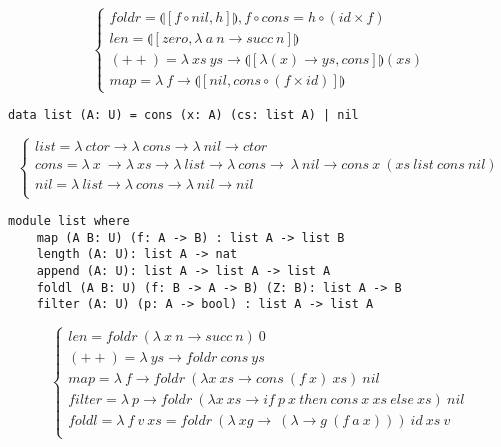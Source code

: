 $$
\begin{cases}
 foldr = \llparenthesis [ f \circ nil , h] \rrparenthesis, f \circ cons = h \circ (id \times f)\\
 len = \llparenthesis [ zero, \lambda\ a\ n \rightarrow succ\ n ] \rrparenthesis \\
 (++) = \lambda\ xs\ ys \rightarrow \llparenthesis [ \lambda (x) \rightarrow ys, cons ] \rrparenthesis (xs) \\
 map = \lambda\ f \rightarrow \llparenthesis [ nil, cons \circ (f \times id)] \rrparenthesis
\end{cases}
$$

\begin{lstlisting}[mathescape=true]
data list (A: U) = cons (x: A) (cs: list A) | nil
\end{lstlisting}

$$
\begin{cases}
list = \lambda\ ctor \rightarrow \lambda\ cons \rightarrow \lambda\ nil \rightarrow ctor\\
cons = \lambda\ x\ \rightarrow \lambda\ xs \rightarrow \lambda\ list \rightarrow \lambda\ cons \rightarrow\ \lambda\ nil \rightarrow cons\ x\ (xs\ list\ cons\ nil)\\
nil = \lambda\ list \rightarrow \lambda\ cons \rightarrow \lambda\ nil \rightarrow nil\\
\end{cases}
$$

\begin{lstlisting}[mathescape=true]
module list where
    map (A B: U) (f: A -> B) : list A -> list B
    length (A: U): list A -> nat
    append (A: U): list A -> list A -> list A
    foldl (A B: U) (f: B -> A -> B) (Z: B): list A -> B
    filter (A: U) (p: A -> bool) : list A -> list A
\end{lstlisting}

$$
\begin{cases}
len = foldr\ (\lambda\ x\ n \rightarrow succ\ n)\ 0\\
(++) = \lambda\ ys \rightarrow foldr\ cons\ ys\\
map = \lambda\ f \rightarrow foldr\ (\lambda x\ xs \rightarrow cons\ (f\ x)\ xs)\ nil\\
filter = \lambda\ p \rightarrow foldr\ (\lambda x\ xs \rightarrow if\ p\ x\ then\ cons\ x\ xs\ else\ xs)\ nil\\
foldl = \lambda\ f\ v\ xs = foldr\ (\lambda\ xg\rightarrow\ (\lambda \rightarrow g\ (f\ a\ x)))\ id\ xs\ v\\
\end{cases}
$$

